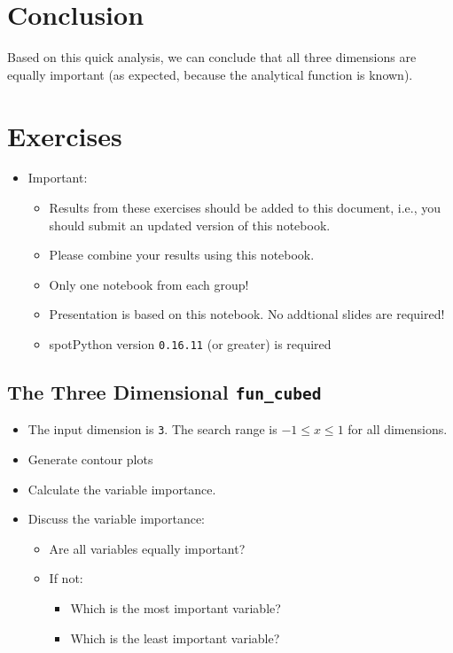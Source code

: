 \documentclass[
  letterpaper,
  DIV=11,
  numbers=noendperiod]{scrreprt}
\providecommand{\tightlist}{%
  \setlength{\itemsep}{0pt}\setlength{\parskip}{0pt}}\usepackage{longtable,booktabs,array}
\begin{document}
\hypertarget{conclusion}{%
\section{Conclusion}\label{conclusion}}

Based on this quick analysis, we can conclude that all three dimensions
are equally important (as expected, because the analytical function is
known).

\hypertarget{exercises}{%
\section{Exercises}\label{exercises}}

\begin{itemize}
\tightlist
\item
  Important:

  \begin{itemize}
  \tightlist
  \item
    Results from these exercises should be added to this document, i.e.,
    you should submit an updated version of this notebook.
  \item
    Please combine your results using this notebook.
  \item
    Only one notebook from each group!
  \item
    Presentation is based on this notebook. No addtional slides are
    required!
  \item
    spotPython version \texttt{0.16.11} (or greater) is required
  \end{itemize}
\end{itemize}

\hypertarget{the-three-dimensional-fun_cubed}{%
\subsection{\texorpdfstring{The Three Dimensional
\texttt{fun\_cubed}}{The Three Dimensional fun\_cubed}}\label{the-three-dimensional-fun_cubed}}

\begin{itemize}
\tightlist
\item
  The input dimension is \texttt{3}. The search range is
  \(-1 \leq x \leq 1\) for all dimensions.
\item
  Generate contour plots
\item
  Calculate the variable importance.
\item
  Discuss the variable importance:

  \begin{itemize}
  \tightlist
  \item
    Are all variables equally important?
  \item
    If not:

    \begin{itemize}
    \tightlist
    \item
      Which is the most important variable?
    \item
      Which is the least important variable?
    \end{itemize}
  \end{itemize}
\end{itemize}
\end{document}
